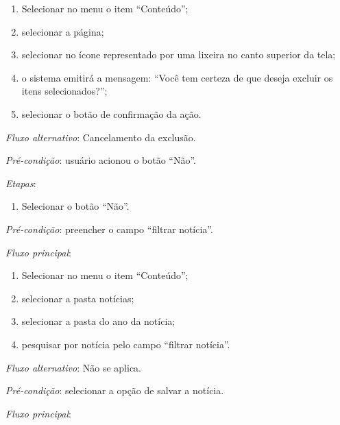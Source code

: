 \begin{enumerate}
    \item Selecionar no menu o item ``Conteúdo'';
    \item selecionar a página;
    \item selecionar no ícone representado por uma lixeira no canto superior da tela;
    \item o sistema emitirá a mensagem: ``Você tem certeza de que deseja excluir os itens selecionados?'';
    \item selecionar o botão de confirmação da ação.
\end{enumerate}

\noindent \textit{Fluxo alternativo}: Cancelamento da exclusão.

\noindent \textit{Pré-condição}: usuário acionou o botão ``Não''.

\noindent \textit{Etapas}:

\begin{enumerate}
    \item Selecionar o botão ``Não''.
\end{enumerate}



\vspace{0.7cm}

\noindent \textit{Pré-condição}: preencher o campo ``filtrar notícia''.

\noindent \textit{Fluxo principal}:

\begin{enumerate}
    \item Selecionar no menu o item ``Conteúdo'';
    \item selecionar a pasta notícias;
    \item selecionar a pasta do ano da notícia;
    \item pesquisar por notícia pelo campo ``filtrar notícia''.
\end{enumerate}

\noindent \textit{Fluxo alternativo}: Não se aplica.


\vspace{0.7cm}

\noindent \textit{Pré-condição}: selecionar a opção de salvar a notícia.

\noindent \textit{Fluxo principal}:

